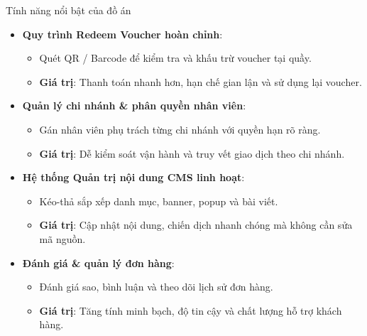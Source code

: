 \documentclass{beamer}
\begin{document}
\begin{frame}{Tính năng nổi bật của đồ án}
\small
\begin{itemize}
  \item \textbf{Quy trình Redeem Voucher hoàn chỉnh}:
    \begin{itemize}
      \item Quét QR / Barcode để kiểm tra và khấu trừ voucher tại quầy.
      \item \textbf{Giá trị}: Thanh toán nhanh hơn, hạn chế gian lận và sử dụng lại voucher.
    \end{itemize}
  \item \textbf{Quản lý chi nhánh \& phân quyền nhân viên}:
    \begin{itemize}
      \item Gán nhân viên phụ trách từng chi nhánh với quyền hạn rõ ràng.
      \item \textbf{Giá trị}: Dễ kiểm soát vận hành và truy vết giao dịch theo chi nhánh.
    \end{itemize}
  \item \textbf{Hệ thống Quản trị nội dung CMS linh hoạt}:
    \begin{itemize}
      \item Kéo-thả sắp xếp danh mục, banner, popup và bài viết.
      \item \textbf{Giá trị}: Cập nhật nội dung, chiến dịch nhanh chóng mà không cần sửa mã nguồn.
    \end{itemize}
  \item \textbf{Đánh giá \& quản lý đơn hàng}:
    \begin{itemize}
      \item Đánh giá sao, bình luận và theo dõi lịch sử đơn hàng.
      \item \textbf{Giá trị}: Tăng tính minh bạch, độ tin cậy và chất lượng hỗ trợ khách hàng.
    \end{itemize}
\end{itemize}
\end{frame}
\end{document}
